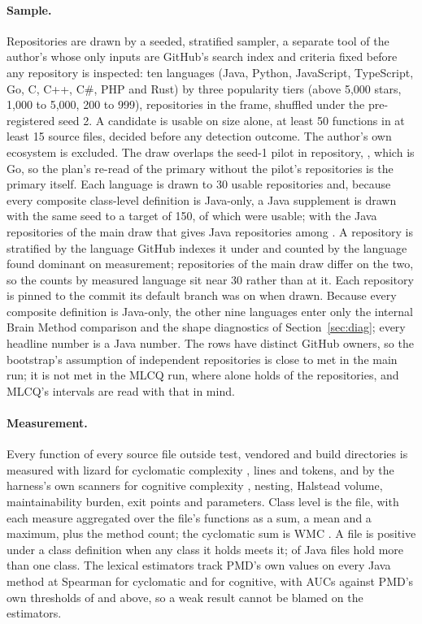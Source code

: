 \documentclass[11pt,a4paper]{article}
\begin{document}
\paragraph{Sample.} Repositories are drawn by a seeded, stratified sampler, a
separate tool of the author's whose only inputs are GitHub's search index and
criteria fixed before any repository is inspected: ten languages (Java,
Python, JavaScript, TypeScript, Go, C, C++, C\#, PHP and Rust) by three
popularity tiers (above 5{,}000 stars, 1{,}000 to 5{,}000, 200 to 999),
\samplePopulation{} repositories in the frame, shuffled under the
pre-registered seed 2. A candidate is usable on size alone, at least 50
functions in at least 15 source files, decided before any detection outcome.
The author's own ecosystem is excluded. The draw overlaps the seed-1 pilot
in \nPilotOverlap{} repository, \pilotOverlapRepo{}, which is Go, so the
plan's re-read of the primary without the pilot's repositories is the primary
itself. Each language is drawn to 30 usable
repositories and, because every composite class-level definition is Java-only,
a Java supplement is drawn with the same seed to a target of 150, of which
\nJavaSupp{} were usable; with the \nJavaMain{} Java repositories of the main
draw that gives \nJava{} Java repositories among \nUsable{}. A repository is
stratified by the language GitHub indexes it under and counted by the
language found dominant on measurement; \sampleCrossStratumN{} repositories
of the main draw differ on the two, so the counts by measured language sit
near 30 rather than at it. Each repository is pinned to the commit its
default branch was on when drawn. Because every composite definition is
Java-only, the other nine languages enter only the internal Brain Method
comparison and the shape diagnostics of Section~\ref{sec:diag}; every
headline number is a Java number. The \nUsable{} rows have \nOwners{} distinct
GitHub owners, so the bootstrap's assumption of independent repositories is
close to met in the main run; it is not met in the MLCQ run, where
\mlcqTopOwner{} alone holds \mlcqApacheShare{} of the repositories, and MLCQ's
intervals are read with that in mind.

\paragraph{Measurement.} Every function of every source file outside test,
vendored and build directories is measured with lizard \cite{lizard} for
cyclomatic complexity \cite{mcCabe1976}, lines and tokens, and by the
harness's own scanners for cognitive complexity \cite{campbell2018}, nesting,
Halstead volume, maintainability burden, exit points and parameters. Class
level is the file, with each measure aggregated over the file's functions as a
sum, a mean and a maximum, plus the method count; the cyclomatic sum is WMC
\cite{ck1994}. A file is positive under a class definition when any class it
holds meets it; \javaFilesMultiPct{} of Java files hold more than one class.
The lexical estimators track PMD's own values on every Java method at Spearman
\calibCcRho{} for cyclomatic and \calibCognitiveRho{} for cognitive, with AUCs
against PMD's own thresholds of \calibCcAuc{} and above, so a weak result
cannot be blamed on the estimators.
\end{document}
